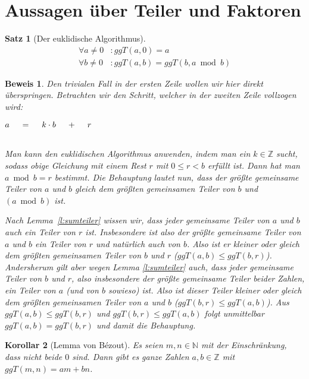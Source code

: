 \documentclass[a4paper]{article}
\newtheorem{satz}{Satz}[section] %
\newtheorem{korollar}[satz]{Korollar}
\theoremstyle{nonumberplain}
\newtheorem{beweis}{Beweis}
\begin{document}
\section{Aussagen über Teiler und Faktoren}

\begin{satz}[Der euklidische Algorithmus]\label{s:eukl}
	\begin{align*}
		\forall a \neq 0 &: ggT(a,0) = a \\
		\forall b \neq 0 &: ggT(a,b) = ggT(b, a\bmod b)
	\end{align*}
\end{satz}

\begin{beweis}
Den trivialen Fall in der ersten Zeile wollen wir hier direkt überspringen. Betrachten wir den Schritt, welcher in der zweiten Zeile vollzogen wird:\\
\centerline{$a \hspace{3ex} = \hspace{3ex} k \cdot b \hspace{3ex} + \hspace{3ex} r $}\\
Man kann den euklidischen Algorithmus anwenden, indem man ein $k \in \mathbb{Z}$ sucht, sodass obige Gleichung mit einem Rest $r$ mit $0 \leq r < b$ erfüllt ist. Dann hat man $a \bmod b = r$ bestimmt.
Die Behauptung lautet nun, dass der größte gemeinsame Teiler von $a$ und $b$ gleich dem größten gemeinsamen Teiler von $b$ und $(a \bmod b)$ ist.

Nach Lemma~\ref{l:sumteiler} wissen wir, dass jeder gemeinsame Teiler von $a$ und $b$ auch ein Teiler von $r$ ist. Insbesondere ist also der größte gemeinsame Teiler von $a$ und $b$ ein Teiler von $r$ und natürlich auch von $b$. Also ist er kleiner oder gleich dem größten gemeinsamen Teiler von $b$ und $r$ ($ggT(a,b) \leq ggT(b,r)$). Andersherum gilt aber wegen Lemma \ref{l:sumteiler} auch, dass jeder gemeinsame Teiler von $b$ und $r$, also insbesondere der größte gemeinsame Teiler beider Zahlen, ein Teiler von $a$ (und von $b$ sowieso) ist. Also ist dieser Teiler kleiner oder gleich dem größten gemeinsamen Teiler von $a$ und $b$ ($ggT(b,r) \leq ggT(a,b)$).
Aus $ggT(a,b) \leq ggT(b,r)$ und $ggT(b,r) \leq ggT(a,b)$ folgt unmittelbar $ggT(a,b)=ggT(b,r)$ und damit die Behauptung.
\end{beweis}

\begin{korollar}[Lemma von Bézout]\label{l:bez}
Es seien $m,n \in \mathbb{N}$ mit der Einschränkung, dass nicht beide $0$ sind. Dann gibt es ganze Zahlen $a,b \in \mathbb{Z} $ mit $ggT(m,n) = am + bn$.
\end{korollar}
\end{document}
